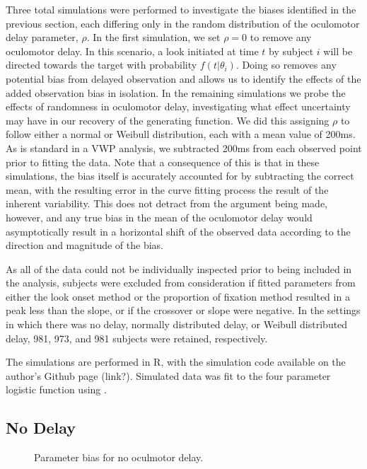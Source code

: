 Three total simulations were performed to investigate the biases identified in the previous section, each differing only in the random distribution of the oculomotor delay parameter, $\rho$. In the first simulation, we set $\rho = 0$ to remove any oculomotor delay. In this scenario, a look initiated at time $t$ by subject $i$ will be directed towards the target with probability $f(t|\theta_i)$. Doing so removes any potential bias from delayed observation and allows us to identify the effects of the added observation bias in isolation. In the remaining simulations we probe the effects of randomness in oculomotor delay, investigating what effect uncertainty may have in our recovery of the generating function. We did this assigning $\rho$ to follow either a normal or Weibull distribution, each with a mean value of 200ms. As is standard in a VWP analysis, we subtracted 200ms from each observed point prior to fitting the data. Note that a consequence of this is that in these simulations, the bias itself is accurately accounted for by subtracting the correct mean, with the resulting error in the curve fitting process the result of the inherent variability. This does not detract from the argument being made, however, and any true bias in the mean of the oculomotor delay would asymptotically result in a horizontal shift of the observed data according to the direction and magnitude of the bias.

As all of the data could not be individually inspected prior to being included in the analysis, subjects were excluded from consideration if fitted parameters from either the look onset method or the proportion of fixation method resulted in a peak less than the slope, or if the crossover or slope were negative. In the settings in which there was no delay, normally distributed delay, or Weibull distributed delay, 981, 973, and 981 subjects were retained, respectively.

The simulations are performed in R, with the simulation code available on the author's Github page (link?). Simulated data was fit to the four parameter logistic function using .


\subsection{No Delay}



\begin{figure}[H]
\centering
\caption{Parameter bias for no oculmotor delay. }
\label{fig:par_bias_no_delay}
\end{figure}

